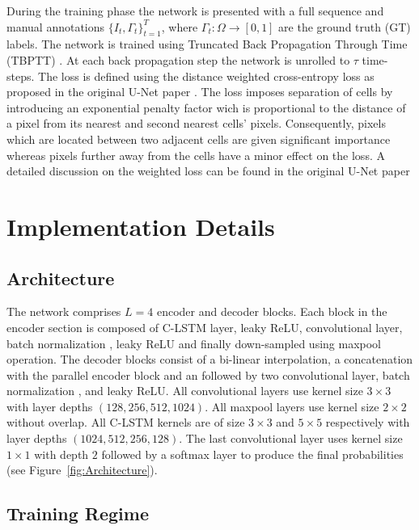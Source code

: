 \documentclass{article}
\begin{document}
During the training phase the network is presented with a full sequence and manual annotations $\{I_t,\Gamma_t\}_{t=1}^T$, where $\Gamma_t: \Omega\rightarrow[0,1]$ are the ground truth (GT) labels. 
The network is trained using Truncated Back Propagation Through Time (TBPTT) \cite{williams1990efficient}. At each back propagation step the network is unrolled to $\tau$ time-steps. The loss is defined using the distance weighted cross-entropy loss as proposed in the original U-Net paper \cite{Ronneberger15}. The loss imposes separation of cells by introducing an exponential penalty factor wich is  proportional to the distance of a pixel from its nearest and second nearest cells' pixels. Consequently, pixels which are located between two adjacent cells are given significant importance whereas pixels further away from the cells have a minor effect on the loss. A detailed discussion on the weighted loss can be found in the original U-Net paper \cite{Ronneberger15}





\section{Implementation Details}\label{sec:Implementation Details}

\subsection{Architecture}
The network comprises $L=4$ encoder and decoder blocks. Each block in the encoder section is composed of C-LSTM layer, leaky ReLU, convolutional layer, batch normalization \cite{ioffe2015batchnorm}, leaky ReLU and finally down-sampled using maxpool operation. The decoder blocks consist of a bi-linear interpolation, a concatenation with the parallel encoder block and  an followed by two convolutional layer, batch normalization \cite{ioffe2015batchnorm}, and leaky ReLU.  All convolutional layers use kernel size $3\times 3$ with layer depths $(128,256,512,1024)$. All maxpool layers use kernel size $2\times 2$ without overlap. All C-LSTM kernels are of size $3\times 3$ and $5
\times 5$ respectively with layer depths $(1024,512,256,128)$. The last convolutional layer uses kernel size $1\times 1$ with depth $2$ followed by a softmax layer to produce the final probabilities (see Figure~\ref{fig:Architecture}).

\subsection{Training Regime}
\end{document}
